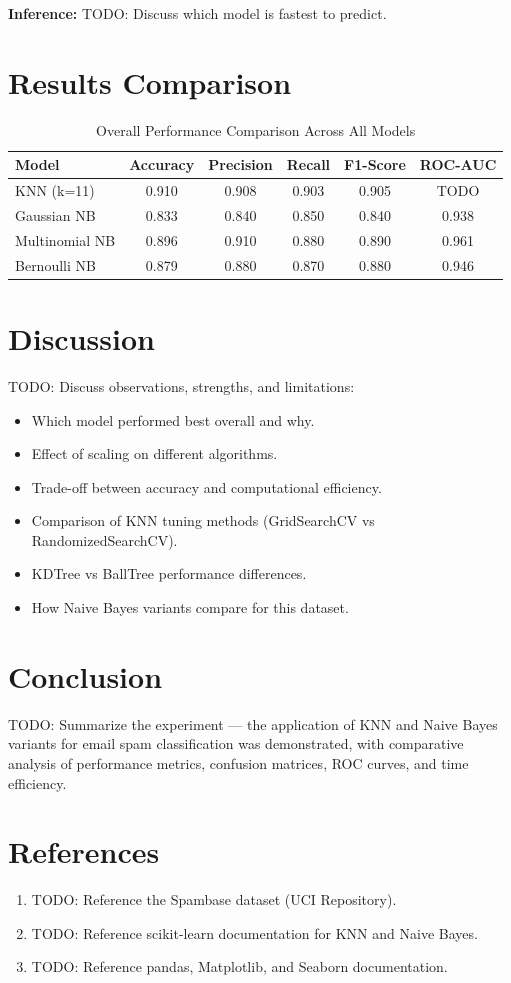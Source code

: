 \documentclass[12pt,a4paper]{article}
\begin{document}
\textbf{Inference:}
TODO: Discuss which model is fastest to predict.

\section{Results Comparison}
\begin{table}[H]
\centering
\begin{tabular}{lccccc}
\toprule
\textbf{Model} & \textbf{Accuracy} & \textbf{Precision} & \textbf{Recall} & \textbf{F1-Score} & \textbf{ROC-AUC} \\ \midrule
KNN (k=11) & 0.910 & 0.908 & 0.903 & 0.905 & TODO \\
Gaussian NB & 0.833 & 0.840 & 0.850 & 0.840 & 0.938 \\
Multinomial NB & 0.896 & 0.910 & 0.880 & 0.890 & 0.961 \\
Bernoulli NB & 0.879 & 0.880 & 0.870 & 0.880 & 0.946 \\
\bottomrule
\end{tabular}
\caption{Overall Performance Comparison Across All Models}
\end{table}

\section{Discussion}
TODO: Discuss observations, strengths, and limitations:
\begin{itemize}
    \item Which model performed best overall and why.
    \item Effect of scaling on different algorithms.
    \item Trade-off between accuracy and computational efficiency.
    \item Comparison of KNN tuning methods (GridSearchCV vs RandomizedSearchCV).
    \item KDTree vs BallTree performance differences.
    \item How Naive Bayes variants compare for this dataset.
\end{itemize}

\section{Conclusion}
TODO: Summarize the experiment — the application of KNN and Naive Bayes variants for email spam classification was demonstrated, with comparative analysis of performance metrics, confusion matrices, ROC curves, and time efficiency.

\section{References}
\begin{enumerate}
    \item TODO: Reference the Spambase dataset (UCI Repository).
    \item TODO: Reference scikit-learn documentation for KNN and Naive Bayes.
    \item TODO: Reference pandas, Matplotlib, and Seaborn documentation.
\end{enumerate}
\end{document}
